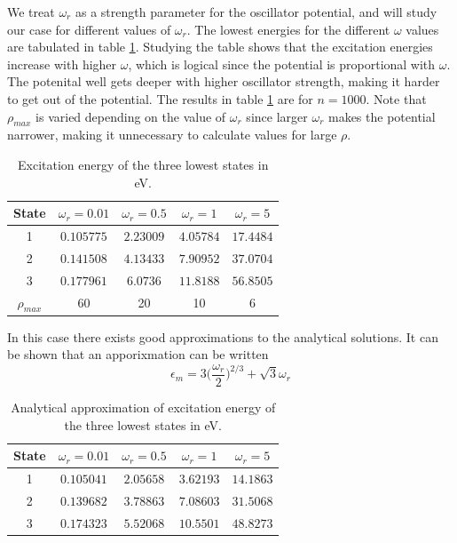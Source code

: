 \documentclass{aa}   %
\begin{document}
We treat $\omega_r$ as a strength parameter for the oscillator potential, and will study our case for different values of $\omega_r$. The lowest energies for the different $\omega$ values are tabulated in table \ref{Eigenvalues}. Studying the table shows that the excitation energies increase with higher $\omega$, which is logical since the potential is proportional with $\omega$. The potenital well gets deeper with higher oscillator strength, making it harder to get out of the potential.
The results in table \ref{Eigenvalues} are for $n = 1000$. Note that $\rho_{max}$ is varied depending on the value of $\omega_r$ since larger $\omega_r$ makes the potential narrower, making it unnecessary to calculate values for large $\rho$. 
\begin{table}
\begin{tabular}{| c | c | c | c | c |}
\hline
State & $\omega_r = 0.01$ & $\omega_r = 0.5$ & $\omega_r = 1$ & $\omega_r = 5$\\
\hline
1 & $0.105775$ & $2.23009$& $4.05784$ & $17.4484$\\
\hline
2 & $0.141508$ & $4.13433$& $7.90952$ & $37.0704$\\
\hline
3 & $0.177961$ & $6.0736$& $11.8188$ & $56.8505$\\
\hline
$\rho_{max}$ & 60 & 20 &10 &6 \\
\hline
\end{tabular}
\caption{Excitation energy of the three lowest states in eV.}
\label{Eigenvalues}
\end{table}

In this case there exists good approximations to the analytical solutions. It can be shown that an apporixmation can be written
\begin{equation}
 \epsilon_m = 3\bigg(\frac{\omega_r}{2}\bigg)^{2/3} + \sqrt{3} \omega_r
\end{equation}

\begin{table}
\begin{tabular}{| c | c | c | c | c |}
\hline
State & $\omega_r = 0.01$ & $\omega_r = 0.5$ & $\omega_r = 1$ & $\omega_r = 5$\\
\hline
1 & $0.105041$ & $2.05658$& $3.62193$ & $14.1863$\\
\hline
2 & $0.139682$ & $3.78863$& $7.08603$ & $31.5068$\\
\hline
3 & $0.174323$ & $5.52068$& $10.5501$ & $48.8273$\\
\hline
\end{tabular}
\caption{Analytical approximation of excitation energy of the three lowest states in eV.}
\label{Analytical}
\end{table}
\end{document}
